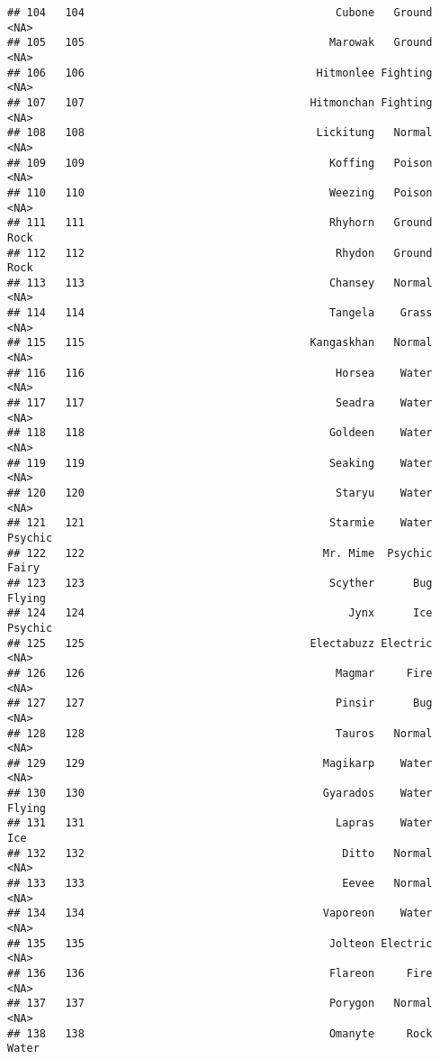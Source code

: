 \documentclass[
]{article}
\begin{document}
\begin{verbatim}
## 104   104                                       Cubone   Ground     <NA>
## 105   105                                      Marowak   Ground     <NA>
## 106   106                                    Hitmonlee Fighting     <NA>
## 107   107                                   Hitmonchan Fighting     <NA>
## 108   108                                    Lickitung   Normal     <NA>
## 109   109                                      Koffing   Poison     <NA>
## 110   110                                      Weezing   Poison     <NA>
## 111   111                                      Rhyhorn   Ground     Rock
## 112   112                                       Rhydon   Ground     Rock
## 113   113                                      Chansey   Normal     <NA>
## 114   114                                      Tangela    Grass     <NA>
## 115   115                                   Kangaskhan   Normal     <NA>
## 116   116                                       Horsea    Water     <NA>
## 117   117                                       Seadra    Water     <NA>
## 118   118                                      Goldeen    Water     <NA>
## 119   119                                      Seaking    Water     <NA>
## 120   120                                       Staryu    Water     <NA>
## 121   121                                      Starmie    Water  Psychic
## 122   122                                     Mr. Mime  Psychic    Fairy
## 123   123                                      Scyther      Bug   Flying
## 124   124                                         Jynx      Ice  Psychic
## 125   125                                   Electabuzz Electric     <NA>
## 126   126                                       Magmar     Fire     <NA>
## 127   127                                       Pinsir      Bug     <NA>
## 128   128                                       Tauros   Normal     <NA>
## 129   129                                     Magikarp    Water     <NA>
## 130   130                                     Gyarados    Water   Flying
## 131   131                                       Lapras    Water      Ice
## 132   132                                        Ditto   Normal     <NA>
## 133   133                                        Eevee   Normal     <NA>
## 134   134                                     Vaporeon    Water     <NA>
## 135   135                                      Jolteon Electric     <NA>
## 136   136                                      Flareon     Fire     <NA>
## 137   137                                      Porygon   Normal     <NA>
## 138   138                                      Omanyte     Rock    Water

\end{verbatim}
\end{document}
